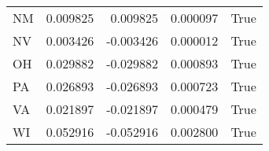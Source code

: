 \begin{table}
\begin{tabular}{lrrrl}
      NM &   0.009825 &  0.009825 &       0.000097 &          True \\
      NV &   0.003426 & -0.003426 &       0.000012 &          True \\
      OH &   0.029882 & -0.029882 &       0.000893 &          True \\
      PA &   0.026893 & -0.026893 &       0.000723 &          True \\
      VA &   0.021897 & -0.021897 &       0.000479 &          True \\
      WI &   0.052916 & -0.052916 &       0.002800 &          True \\
\bottomrule
\end{tabular}
\end{table}
